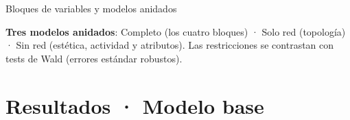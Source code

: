 \documentclass[
  8pt,
  ignorenonframetext,
  aspectratio=169,
  spanish,
]{beamer}
\newcommand{\roadmapcontent}{}
\begin{document}
\begin{frame}{Bloques de variables y modelos anidados}
\begin{tcolorbox}
\textbf{Tres modelos anidados}: Completo (los cuatro bloques) · Solo red
(topología) · Sin red (estética, actividad y atributos). Las
restricciones se contrastan con tests de Wald (errores estándar
robustos).

\end{tcolorbox}


\gdef\roadmapcontent{{\scriptsize \mbox{\color{black!40}Parte 1 · Currículum}\quad \mbox{\color{black!40}Parte 2 · Propuesta docente}\quad \mbox{\color{mDarkTeal}\bfseries Parte 3 · Propuesta investigadora: Creative collaborations}\par}
\vspace{0.8em}
{\large \mbox{\color{black!40}Motivación y contexto}~· \mbox{\color{black!40}Datos y diseño}~· \mbox{\color{mDarkTeal}\bfseries Resultados}~· \mbox{\color{black!40}Conclusiones}\par}
\vspace{0.2em}
\hspace{1.5em}{\normalsize \mbox{\color{mDarkTeal}\bfseries Modelo base}~· \mbox{\color{black!40}Predicción}~· \mbox{\color{black!40}Sensibilidad}\par}}
\end{frame}

\section{Resultados · Modelo base}\label{resultados-modelo-base}
\end{document}
